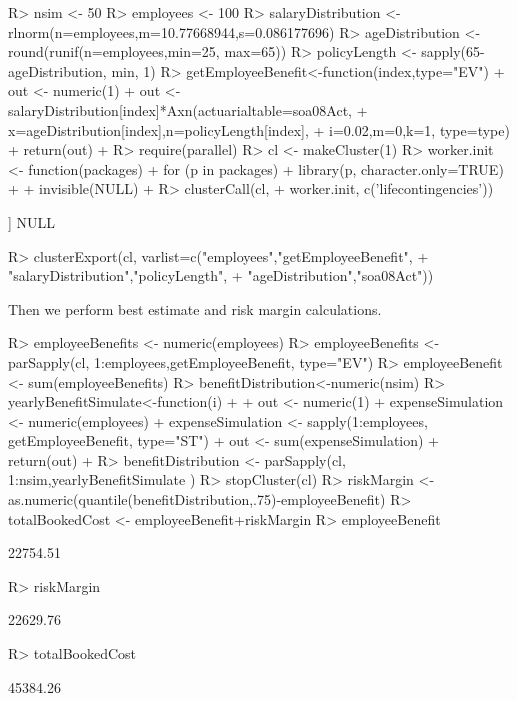 \documentclass[nojss]{jss}
\begin{document}
\begin{Schunk}
\begin{Sinput}
R> nsim <- 50
R> employees <- 100
R> salaryDistribution <- rlnorm(n=employees,m=10.77668944,s=0.086177696)
R> ageDistribution <- round(runif(n=employees,min=25, max=65))
R> policyLength <- sapply(65-ageDistribution, min, 1)
R> getEmployeeBenefit<-function(index,type="EV") {
+  	out <- numeric(1)
+  	out <- salaryDistribution[index]*Axn(actuarialtable=soa08Act, 
+  			x=ageDistribution[index],n=policyLength[index], 
+  			i=0.02,m=0,k=1, type=type)
+  	return(out)
+  }
R> require(parallel)
R> cl <- makeCluster(1) 
R> worker.init <- function(packages) {
+  	for (p in packages) {
+  		library(p, character.only=TRUE)
+  	}
+  	invisible(NULL)
+  }
R> clusterCall(cl, 
+  		worker.init, c('lifecontingencies'))
\end{Sinput}
\begin{Soutput}
[[1]]
NULL
\end{Soutput}
\begin{Sinput}
R> clusterExport(cl, varlist=c("employees","getEmployeeBenefit",
+  				"salaryDistribution","policyLength",
+  				"ageDistribution","soa08Act"))
\end{Sinput}
\end{Schunk}
Then we perform best estimate and risk margin calculations.

\begin{Schunk}
\begin{Sinput}
R> employeeBenefits <- numeric(employees)
R> employeeBenefits <- parSapply(cl, 1:employees,getEmployeeBenefit, type="EV")
R> employeeBenefit <- sum(employeeBenefits)
R> benefitDistribution<-numeric(nsim)
R> yearlyBenefitSimulate<-function(i)
+  {
+  	out <- numeric(1)
+  	expenseSimulation <- numeric(employees)
+  	expenseSimulation <- sapply(1:employees, getEmployeeBenefit, type="ST")
+  	out <- sum(expenseSimulation)
+  	return(out)
+  }
R> benefitDistribution <- parSapply(cl, 1:nsim,yearlyBenefitSimulate )
R> stopCluster(cl)
R> riskMargin <- as.numeric(quantile(benefitDistribution,.75)-employeeBenefit)
R> totalBookedCost <- employeeBenefit+riskMargin
R> employeeBenefit
\end{Sinput}
\begin{Soutput}
[1] 22754.51
\end{Soutput}
\begin{Sinput}
R> riskMargin
\end{Sinput}
\begin{Soutput}
[1] 22629.76
\end{Soutput}
\begin{Sinput}
R> totalBookedCost
\end{Sinput}
\begin{Soutput}
[1] 45384.26
\end{Soutput}
\end{Schunk}
\end{document}
